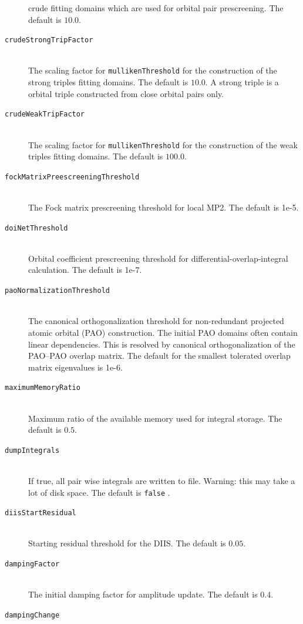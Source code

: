 \documentclass[bibliography=totocnumbered,a4paper,10pt,oneside]{scrbook}
\newcommand{\ttt}[1]{%
  \begingroup\setlength{\fboxsep}{1pt}%
  \colorbox{serenity-green!30}{\texttt{\hspace*{2pt}\vphantom{(g}#1\hspace*{2pt}}}%
  \endgroup
}
\begin{document}
\begin{description}
    crude fitting domains which are used for orbital pair prescreening. The default is $10.0$.
    \item [\texttt{crudeStrongTripFactor}]\hfill \\
    The scaling factor for \ttt{mullikenThreshold} for the construction of the strong triples
    fitting domains. The default is $10.0$. A strong triple is a orbital triple constructed from
    close orbital pairs only.
    \item [\texttt{crudeWeakTripFactor}]\hfill \\
    The scaling factor for \ttt{mullikenThreshold} for the construction of the weak triples
    fitting domains. The default is $100.0$.
    \item [\texttt{fockMatrixPreescreeningThreshold}]\hfill \\
    The Fock matrix prescreening threshold for local MP2. The default is 1e-5.
    \item [\texttt{doiNetThreshold}]\hfill \\
    Orbital coefficient prescreening threshold for differential-overlap-integral calculation. The default
    is 1e-7.
    \item [\texttt{paoNormalizationThreshold}]\hfill \\
    The canonical orthogonalization threshold for non-redundant projected atomic orbital (PAO) construction.
    The initial PAO domains often contain linear dependencies. This is resolved by canonical orthogonalization of
    the PAO--PAO overlap matrix. The default for the smallest tolerated overlap matrix eigenvalues is
    1e-6.
    \item [\texttt{maximumMemoryRatio}]\hfill \\
    Maximum ratio of the available memory used for integral storage. The default is $0.5$.
    \item [\texttt{dumpIntegrals}]\hfill \\
    If true, all pair wise integrals are written to file. Warning: this may take a lot of disk space.
    The default is \ttt{false}.
    \item [\texttt{diisStartResidual}]\hfill \\
    Starting residual threshold for the DIIS. The default is $0.05$.
    \item [\texttt{dampingFactor}]\hfill \\
    The initial damping factor for amplitude update. The default is $0.4$.
    \item [\texttt{dampingChange}]\hfill \\

\end{description}
\end{document}
